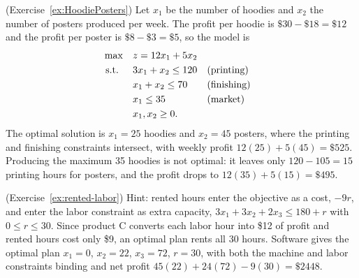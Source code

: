 \begin{solution}(Exercise~\ref{ex:HoodiePosters})
Let $x_1$ be the number of hoodies and $x_2$ the number of posters produced per week.  The profit per hoodie is $\$30 - \$18 = \$12$ and the profit per poster is $\$8 - \$3 = \$5$, so the model is
\begin{align*}
\max \quad & z = 12x_1 + 5x_2\\
\text{ s.t. } \quad & 3x_1 + x_2 \leq 120 && \text{(printing)}\\
& x_1 + x_2 \leq 70 && \text{(finishing)}\\
& x_1 \leq 35 && \text{(market)}\\
& x_1, x_2 \geq 0.
\end{align*}
The optimal solution is $x_1 = 25$ hoodies and $x_2 = 45$ posters, where the printing and finishing constraints intersect, with weekly profit $12(25) + 5(45) = \$525$.  Producing the maximum 35 hoodies is not optimal: it leaves only $120 - 105 = 15$ printing hours for posters, and the profit drops to $12(35) + 5(15) = \$495$.
\end{solution}

\begin{solution}(Exercise~\ref{ex:rented-labor})
Hint: rented hours enter the objective as a cost, $-9r$, and enter the labor constraint as extra capacity, $3x_1 + 3x_2 + 2x_3 \leq 180 + r$ with $0 \leq r \leq 30$.  Since product C converts each labor hour into \$12 of profit and rented hours cost only \$9, an optimal plan rents all 30 hours.  Software gives the optimal plan $x_1 = 0$, $x_2 = 22$, $x_3 = 72$, $r = 30$, with both the machine and labor constraints binding and net profit $45(22) + 24(72) - 9(30) = \$2448$.
\end{solution}


